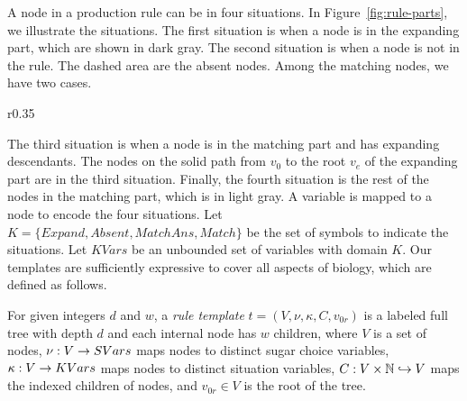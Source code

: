 A node in a production rule can be in four situations.
In Figure~\ref{fig:rule-parts}, we illustrate the situations.
The first situation is when a node is in the expanding part, which are shown in 
dark gray. %
The second situation is when a node is not in the rule.
The dashed area are the absent nodes.
Among the matching nodes, we have two cases.
\begin{wrapfigure}{r}{0.35\textwidth}
        \center
  \caption{Parts of production rules in the rule templates.}
  \label{fig:rule-parts}
  \vspace{-8mm}
\end{wrapfigure}
The third situation is when a node is in the matching part
and has expanding descendants.
The nodes on the solid path from $v_0$ to the root $v_e$ of the expanding part are in the third situation.
Finally, the fourth situation is the rest of the nodes
in the matching part, which is in light gray.
A variable is mapped to a node to encode the four situations.
Let $K =\{Expand,Absent,MatchAns,Match\}$ be the set of symbols to
indicate the situations.
Let $KVars$ be an unbounded set of variables with domain $K$. 
Our templates are sufficiently expressive to cover all aspects of biology, which are defined as follows.

\begin{df}
For given integers $d$ and $w$,
a {\em rule template} $t = (V, \nu, \kappa, C, v_{0r})$ is a labeled full tree with depth $d$ and 
each internal node has $w$ children, where 
$V$ is a set of nodes, $\nu : V \rightarrow SVars$ maps nodes to distinct
sugar choice variables, 
$\kappa : V \rightarrow KVars$ maps nodes to distinct situation variables,
$C : V \times \mathbb{N} \hookrightarrow V$ maps the indexed children of nodes,
and
$v_{0r} \in V$ is the root of the tree.
\end{df}

